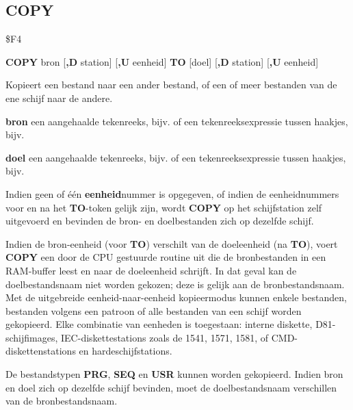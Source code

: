 \subsection{COPY}
\begin{description}[leftmargin=2cm,style=nextline]
\item [Token:]    \$F4

\item [Formaat:]   {\bf COPY} bron [{\bf,D} station] [{\bf,U} eenheid] {\bf TO} [doel] [{\bf ,D} station] [{\bf ,U} eenheid]

\item [Gebruik:]    Kopieert een bestand naar een ander bestand, of een of meer bestanden van de ene schijf naar de andere.

                  {\bf bron} een aangehaalde tekenreeks, bijv.  of een tekenreeksexpressie tussen haakjes, bijv. 

                  {\bf doel} een aangehaalde tekenreeks, bijv.  of een tekenreeksexpressie tussen haakjes, bijv. 

                  \drivedefinition

                  \unitdefinition

                  Indien geen of één {\bf eenheid}nummer is opgegeven, of indien de eenheidnummers voor en na het {\bf TO}-token gelijk zijn, wordt {\bf COPY} op het schijfstation zelf uitgevoerd en bevinden de bron- en doelbestanden zich op dezelfde schijf.

                  Indien de bron-eenheid (voor {\bf TO}) verschilt van de doeleenheid (na {\bf TO}), voert {\bf COPY} een door de CPU gestuurde routine uit die de bronbestanden in een RAM-buffer leest en naar de doeleenheid schrijft. In dat geval kan de doelbestandsnaam niet worden gekozen; deze is gelijk aan de bronbestandsnaam. Met de uitgebreide eenheid-naar-eenheid kopieermodus kunnen enkele bestanden, bestanden volgens een patroon of alle bestanden van een schijf worden gekopieerd. Elke combinatie van eenheden is toegestaan: interne diskette, D81-schijfimages, IEC-diskettestations zoals de 1541, 1571, 1581, of CMD-diskettenstations en hardeschijfstations.

\item [Opmerkingen:]  De bestandstypen {\bf PRG}, {\bf SEQ} en {\bf USR} kunnen worden gekopieerd. Indien bron en doel zich op dezelfde schijf bevinden, moet de doelbestandsnaam verschillen van de bronbestandsnaam.


\end{description}
